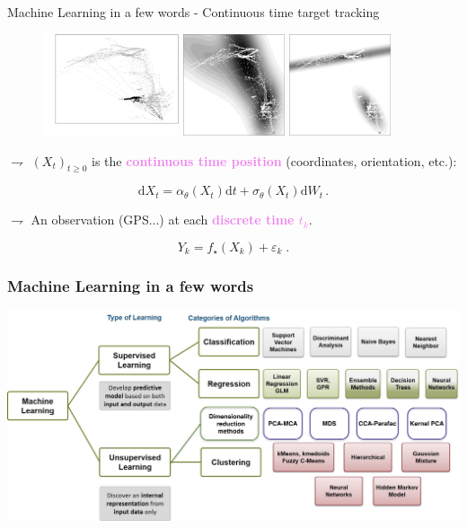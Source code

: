\documentclass[9pt]{beamer}
\newcommand{\eqsp}{\;}
\begin{document}
\begin{frame}{Machine Learning in a few words -  Continuous time target tracking}
\begin{figure}
\includegraphics[height=3cm]{traj_vsl}
\hspace{.2cm}
\includegraphics[height=3cm]{map_data_673_euler}
\hspace{.2cm}
\includegraphics[height=3cm]{map_data_673_ushida}
\end{figure}


\vspace{.45cm}


$\rightharpoondown$ \; $(X_{t})_{t\geqslant 0}$ is the \textcolor{violet}{{\bf continuous time position}} (\alert{coordinates}, \alert{orientation}, etc.): 

\[
\mathrm{d}X_t = \alpha_{\theta}(X_t)\mathrm{d}t + \sigma_{\theta}(X_t)\mathrm{d}W_t\,.
\]

\vspace{.3cm}

$\rightharpoondown$ \; An observation (GPS...) at each \textcolor{violet}{{\bf discrete time $t_k$}}.

$$
Y_{k} = f_{\star}(X_k) + \varepsilon_k\eqsp.
$$
\end{frame}

\begin{frame}\frametitle{Machine Learning in a few words}
\begin{center}
\includegraphics[width=\textwidth]{./Learning+Types.jpg}
\end{center}
\end{frame}
\end{document}
